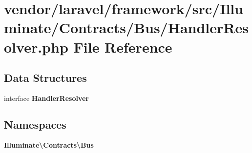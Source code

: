 \section{vendor/laravel/framework/src/\+Illuminate/\+Contracts/\+Bus/\+Handler\+Resolver.php File Reference}
\label{_handler_resolver_8php}
\subsection*{Data Structures}
\begin{DoxyCompactItemize}
\item 
interface {\bf Handler\+Resolver}
\end{DoxyCompactItemize}
\subsection*{Namespaces}
\begin{DoxyCompactItemize}
\item 
 {\bf Illuminate\textbackslash{}\+Contracts\textbackslash{}\+Bus}
\end{DoxyCompactItemize}
